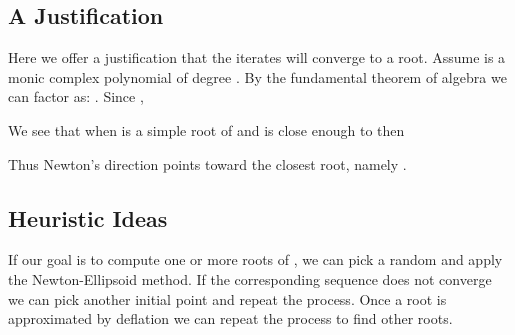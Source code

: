\documentclass{article}
\begin{document}
\begin{center}
\end{center}

\subsection{A Justification}
Here we offer a justification that the iterates will converge to a root.
Assume  is a monic complex polynomial of degree . By the fundamental theorem of algebra we can factor  as: .
Since ,

We see that when  is a simple root of  and  is close enough to  then

Thus Newton's direction points toward the closest root, namely .

\subsection{Heuristic Ideas}  If our goal is to compute one or more roots of ,  we can pick a random  and apply the Newton-Ellipsoid method. If the corresponding sequence does not converge we can pick another initial point and repeat the process. Once a root is approximated by deflation we can repeat the process to find other roots.
\end{document}
